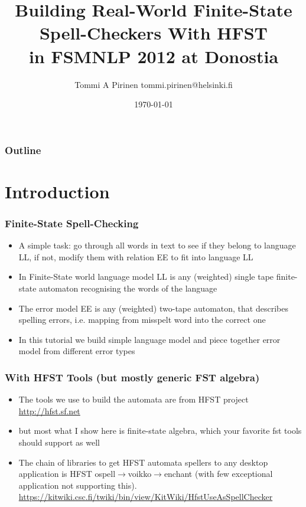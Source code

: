 \documentclass[t,12pt,pdftex]{beamer}
\title{Building Real-World Finite-State Spell-Checkers With HFST\\
in FSMNLP 2012 at Donostia}
\author{Tommi A Pirinen \scriptsize \guilsinglleft{}tommi.pirinen@helsinki.fi\guilsinglright{}}
\institute{University of Helsinki\\Department of Modern Languages}
\date{\today}
\begin{document}

\HyTitle

\begin{frame}
    \frametitle{Outline}
    \tableofcontents
\end{frame}



\section{Introduction}

\begin{frame}
    \frametitle{Finite-State Spell-Checking}
    
    \begin{itemize}
        \item A simple task: go through all words in text to see if they
            belong to language LL, if not, modify them with relation
            EE to fit into language LL
        \item In Finite-State world language model LL is any (weighted) single
            tape finite-state automaton recognising the words of the
            language
        \item The error model EE is any (weighted) two-tape automaton, that
            describes spelling errors, i.e. mapping from misspelt word into
            the correct one
        \item In this tutorial we build simple language model and piece
            together error model from different error types
    \end{itemize}
\end{frame}

\begin{frame}
    \frametitle{With HFST Tools (but mostly generic FST algebra)}
    
    \begin{itemize}
        \item The tools we use to build the automata are from HFST project
            \url{http://hfst.sf.net}
        \item but most what I show here is finite-state algebra, which your
            favorite fst tools should support as well
        \item The chain of libraries to get HFST automata spellers to any
            desktop application is HFST 
            ospell$\rightarrow$voikko$\rightarrow$enchant (with few
            exceptional application not supporting this). 
            \url{https://kitwiki.csc.fi/twiki/bin/view/KitWiki/HfstUseAsSpellChecker}
    \end{itemize}
\end{frame}
\end{document}
